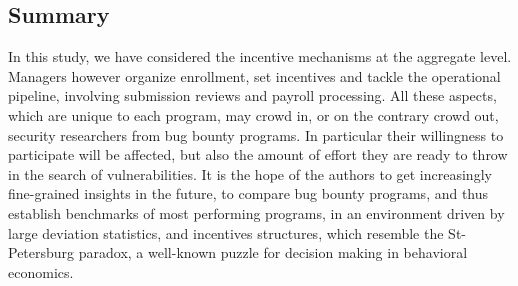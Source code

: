 \subsection{Summary}

In this study, we have considered the incentive mechanisms at the aggregate level. Managers however organize enrollment, set incentives and tackle the operational pipeline, involving submission reviews and payroll processing. All these aspects, which are unique to each program, may crowd in, or on the contrary crowd out, security researchers from bug bounty programs. In particular their willingness to participate will be affected, but also the amount of effort they are ready to throw in the search of vulnerabilities. It is the hope of the authors to get increasingly fine-grained insights in the future, to compare bug bounty programs, and thus establish benchmarks of most performing programs, in an environment driven by large deviation statistics, and incentives structures, which resemble the St-Petersburg paradox, a well-known puzzle for decision making in behavioral economics.
